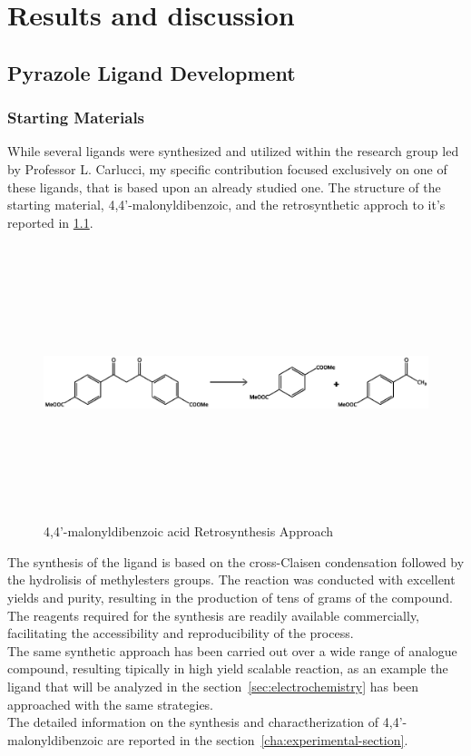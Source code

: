 \documentclass[../Master.tex]{subfiles}
\begin{document}
\chapter{Results and discussion}

\section{Pyrazole Ligand Development}\label{sec:pyr-dev}

\subsection{Starting Materials}\label{sec:starting-materials}

While several ligands were synthesized and utilized within the research group led by Professor L. Carlucci, my specific contribution focused exclusively on one of these ligands, that is based upon an already studied one. The structure of the starting material, 4,4’-malonyldibenzoic, and the retrosynthetic approch to it's reported in \ref{fig:dikest2-retro}.

\begin{figure}[h]
	\centering
	\includegraphics[width=16cm,height=8cm,keepaspectratio]{Structures/dikest2-retro.eps}
	\caption{4,4’-malonyldibenzoic acid Retrosynthesis Approach}\label{fig:dikest2-retro}
\end{figure}

The synthesis of the ligand is based on the cross-Claisen condensation followed by the hydrolisis of methylesters groups. The reaction was conducted with excellent yields and purity, resulting in the production of tens of grams of the compound. The reagents required for the synthesis are readily available commercially, facilitating the accessibility and reproducibility of the process. \\
The same synthetic approach has been carried out over a wide range of analogue compound, resulting tipically in high yield scalable reaction, as an example the ligand that will be analyzed in the section\ \ref{sec:electrochemistry} has been approached with the same strategies.\\
The detailed information on the synthesis and charactherization of 4,4’-malonyldibenzoic are reported in the section\ \ref{cha:experimental-section}.
\newpage
\end{document}

